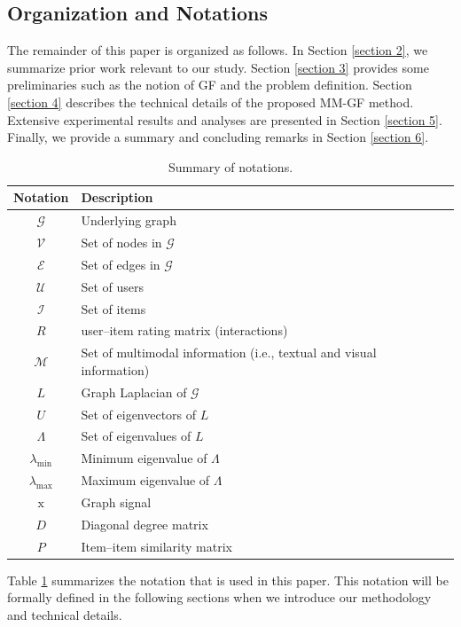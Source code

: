 \documentclass[a4paper,fleqn]{cas-sc}
\begin{document}
\subsection{Organization and Notations}
The remainder of this paper is organized as follows. In Section \ref{section 2}, we summarize prior work relevant to our study. Section \ref{section 3} provides some preliminaries such as the notion of GF and the problem definition. Section \ref{section 4} describes the technical details of the proposed \textsf{MM-GF} method. Extensive experimental results and analyses are presented in Section \ref{section 5}. Finally, we provide a summary and concluding remarks in Section \ref{section 6}.

\begin{table}[b]
\centering
\footnotesize
  \caption{Summary of notations.}
  \begin{tabular}{cl}
    \toprule
    \bf Notation& \bf Description\\
    \hline
    $\mathcal{G}$ & Underlying graph \\
    $\mathcal{V}$ & Set of nodes in $\mathcal{G}$ \\
    $\mathcal{E}$ & Set of edges in $\mathcal{G}$ \\
    $\mathcal{U}$ & Set of users \\
    $\mathcal{I}$ & Set of items \\
    $R$ & user--item rating matrix (interactions)\\
    $\mathcal{M}$ & Set of multimodal information (i.e., textual and visual information) \\
    $L$ & Graph Laplacian of $\mathcal{G}$ \\
    $U$ & Set of eigenvectors of $L$ \\
    $\Lambda$ & Set of eigenvalues of $L$ \\
    $\lambda_{\min}$ & Minimum eigenvalue of $\Lambda$ \\
    $\lambda_{\max}$ & Maximum eigenvalue of $\Lambda$ \\
    $\text{x}$ & Graph signal \\
    $D$ & Diagonal degree matrix \\
    $P$ & Item--item similarity matrix \\
    \bottomrule
\end{tabular}
\label{tab:notations}
\end{table}

Table \ref{tab:notations} summarizes the notation that is used in this paper. This notation will be formally defined in the following sections when we introduce our methodology and technical details.
\end{document}

